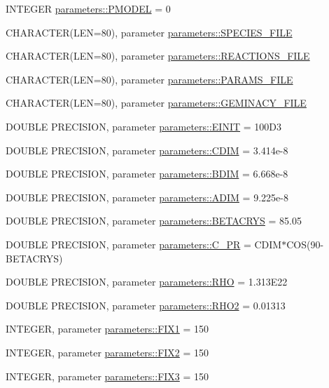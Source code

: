\begin{DoxyCompactItemize}
\item 
INTEGER \hyperlink{namespaceparameters_a38fbcf3f41331f232ff4c604194bc76f}{parameters::PMODEL} = 0
\item 
CHARACTER(LEN=80), parameter \hyperlink{namespaceparameters_af23a39fc248303c9a69e3e05c0fb3b41}{parameters::SPECIES\_\-FILE}
\item 
CHARACTER(LEN=80), parameter \hyperlink{namespaceparameters_a40ef599fa2e91d0f27cbd322f1270da8}{parameters::REACTIONS\_\-FILE}
\item 
CHARACTER(LEN=80), parameter \hyperlink{namespaceparameters_adf79c33c6ebf2e4f00fa0fdaf34d1ba1}{parameters::PARAMS\_\-FILE}
\item 
CHARACTER(LEN=80), parameter \hyperlink{namespaceparameters_a045269697aa491915bf603f55e12b63a}{parameters::GEMINACY\_\-FILE}
\item 
DOUBLE PRECISION, parameter \hyperlink{namespaceparameters_a5f4fb781d85daf37e0a18e15e4dcc9c8}{parameters::EINIT} = 100D3
\item 
DOUBLE PRECISION, parameter \hyperlink{namespaceparameters_a1f6362692e1384b097b58b185096b416}{parameters::CDIM} = 3.414e-\/8
\item 
DOUBLE PRECISION, parameter \hyperlink{namespaceparameters_a3a667857cb5e332f397b7ff0e96dbb85}{parameters::BDIM} = 6.668e-\/8
\item 
DOUBLE PRECISION, parameter \hyperlink{namespaceparameters_ad2ed15127be0caca99788b8acc6e605b}{parameters::ADIM} = 9.225e-\/8
\item 
DOUBLE PRECISION, parameter \hyperlink{namespaceparameters_aaa3c163a9f90b6d0c5a314ca449da18b}{parameters::BETACRYS} = 85.05
\item 
DOUBLE PRECISION, parameter \hyperlink{namespaceparameters_a998d2db873404e0cfe943d50d3877262}{parameters::C\_\-PR} = CDIM$\ast$COS(90-\/BETACRYS)
\item 
DOUBLE PRECISION, parameter \hyperlink{namespaceparameters_ad8323286536365bb131984aa57af99df}{parameters::RHO} = 1.313E22
\item 
DOUBLE PRECISION, parameter \hyperlink{namespaceparameters_a79fa48b917f68e1a12577e33fd8c991c}{parameters::RHO2} = 0.01313
\item 
INTEGER, parameter \hyperlink{namespaceparameters_a2fbeb743f79ed8a1c34482eb24ce3e87}{parameters::FIX1} = 150
\item 
INTEGER, parameter \hyperlink{namespaceparameters_a11cddb5a155baade8a969acb80c17292}{parameters::FIX2} = 150
\item 
INTEGER, parameter \hyperlink{namespaceparameters_adedf5e0e6373ffbf611e8767d9cf0e80}{parameters::FIX3} = 150

\end{DoxyCompactItemize}
